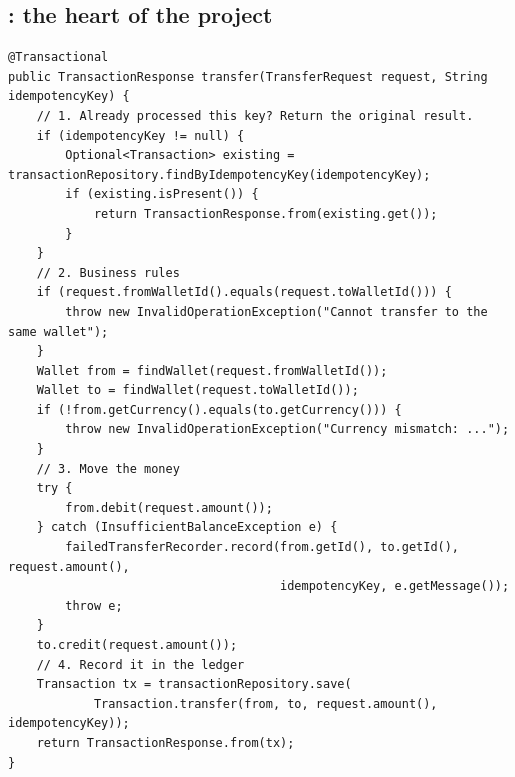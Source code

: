 \documentclass[11pt,a4paper]{article}
\newcommand{\code}[1]{\texttt{\detokenize{#1}}}
\begin{document}
\subsection{\code{TransferService}: the heart of the project}
\begin{lstlisting}
@Transactional
public TransactionResponse transfer(TransferRequest request, String idempotencyKey) {
    // 1. Already processed this key? Return the original result.
    if (idempotencyKey != null) {
        Optional<Transaction> existing = transactionRepository.findByIdempotencyKey(idempotencyKey);
        if (existing.isPresent()) {
            return TransactionResponse.from(existing.get());
        }
    }
    // 2. Business rules
    if (request.fromWalletId().equals(request.toWalletId())) {
        throw new InvalidOperationException("Cannot transfer to the same wallet");
    }
    Wallet from = findWallet(request.fromWalletId());
    Wallet to = findWallet(request.toWalletId());
    if (!from.getCurrency().equals(to.getCurrency())) {
        throw new InvalidOperationException("Currency mismatch: ...");
    }
    // 3. Move the money
    try {
        from.debit(request.amount());
    } catch (InsufficientBalanceException e) {
        failedTransferRecorder.record(from.getId(), to.getId(), request.amount(),
                                      idempotencyKey, e.getMessage());
        throw e;
    }
    to.credit(request.amount());
    // 4. Record it in the ledger
    Transaction tx = transactionRepository.save(
            Transaction.transfer(from, to, request.amount(), idempotencyKey));
    return TransactionResponse.from(tx);
}
\end{lstlisting}
\end{document}
